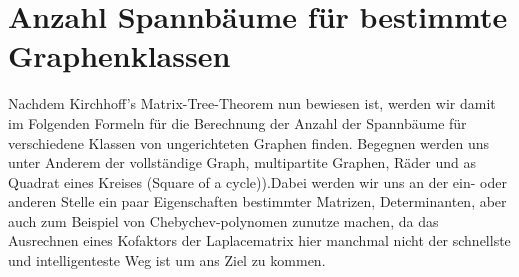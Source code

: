 
\section{Anzahl Spannbäume für bestimmte Graphenklassen}
Nachdem Kirchhoff's Matrix-Tree-Theorem nun bewiesen ist, werden wir damit im Folgenden Formeln für die Berechnung der Anzahl der Spannbäume für verschiedene Klassen von ungerichteten Graphen finden. Begegnen werden uns unter Anderem der vollständige Graph, multipartite Graphen, Räder und as Quadrat eines Kreises (Square of a cycle)).Dabei werden wir uns an der ein- oder anderen Stelle ein paar Eigenschaften bestimmter Matrizen, Determinanten, aber auch zum Beispiel von Chebychev-polynomen zunutze machen, da das Ausrechnen eines Kofaktors der Laplacematrix hier manchmal nicht der schnellste und intelligenteste Weg ist um ans Ziel zu kommen. 







